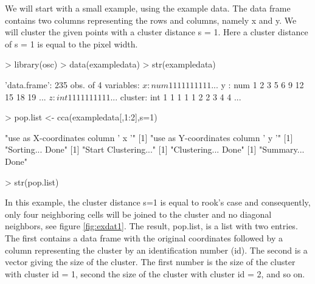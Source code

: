 \documentclass[10pt,a4paper]{article}
\begin{document}
We will start with a small example, using the example data. The data frame contains two columns representing the rows and columns, namely x and y. We will cluster the given points with a cluster distance s = 1. Here a cluster distance of s = 1 is equal to the pixel width.
\begin{Schunk}
\begin{Sinput}
> library(osc)
> data(exampledata)
> str(exampledata)
\end{Sinput}
\begin{Soutput}
'data.frame':	235 obs. of  4 variables:
 $ x      : num  1 1 1 1 1 1 1 1 1 1 ...
 $ y      : num  1 2 3 5 6 9 12 15 18 19 ...
 $ z      : int  1 1 1 1 1 1 1 1 1 1 ...
 $ cluster: int  1 1 1 1 1 2 2 3 4 4 ...
\end{Soutput}
\begin{Sinput}
> pop.list <- cca(exampledata[,1:2],s=1)
\end{Sinput}
\begin{Soutput}
[1] "use as X-coordinates column ' x '"
[1] "use as Y-coordinates column ' y '"
[1] "Sorting... Done"
[1] "Start Clustering..."
[1] "Clustering... Done"
[1] "Summary... Done"
\end{Soutput}
\begin{Sinput}
> str(pop.list)
\end{Sinput}
\end{Schunk}

In this example, the cluster distance s=1 is equal to rook’s case and consequently, only four neighboring cells will be joined to the cluster and no diagonal neighbors, see figure \ref{fig:exdat1}. The result, pop.list, is a list with two entries. The first contains a data frame with the original coordinates followed by a column representing the cluster by an identification number (id). The second is a vector giving the size of the cluster. The first number is the size of the cluster with cluster id = 1, second the size of the cluster with cluster id = 2, and so on.
\end{document}
